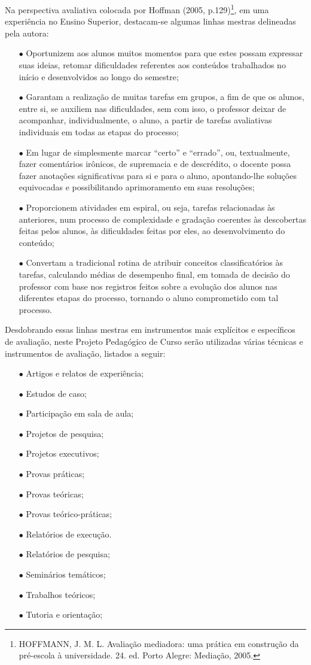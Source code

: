 Na perspectiva avaliativa colocada por Hoffman (2005, p.129)\footnote[5]{HOFFMANN, J. M. L. Avaliação mediadora: uma prática em construção da pré-escola à universidade. 24. ed. Porto Alegre: Mediação, 2005.}, em uma experiência no Ensino Superior, destacam-se algumas linhas mestras delineadas pela autora:
\begin{enumerate}
\item[$\bullet$]Oportunizem aos alunos muitos momentos para que estes possam expressar suas ideias, retomar dificuldades referentes aos conteúdos trabalhados no início e desenvolvidos ao longo do semestre;
\item[$\bullet$]Garantam a realização de muitas tarefas em grupos, a fim de que os alunos, entre si, se auxiliem nas dificuldades, sem com isso, o professor deixar de acompanhar, individualmente, o aluno, a partir de tarefas avaliativas individuais em todas as etapas do processo;
\item[$\bullet$]Em lugar de simplesmente marcar “certo” e “errado”, ou, textualmente, fazer comentários irônicos, de supremacia e de descrédito, o docente possa fazer anotações significativas para si e para o aluno, apontando-lhe soluções equivocadas e possibilitando aprimoramento em suas resoluções;
\item[$\bullet$]Proporcionem atividades em espiral, ou seja, tarefas relacionadas às anteriores, num processo de complexidade e gradação coerentes às descobertas feitas pelos alunos, às dificuldades feitas por eles, ao desenvolvimento do conteúdo;
\item[$\bullet$]Convertam a tradicional rotina de atribuir conceitos classificatórios às tarefas, calculando médias de desempenho final, em tomada de decisão do professor com base nos registros feitos sobre a evolução dos alunos nas diferentes etapas do processo, tornando o aluno comprometido com tal processo.
\end{enumerate}
Desdobrando essas linhas mestras em instrumentos mais explícitos e específicos de avaliação, neste Projeto Pedagógico de Curso serão utilizadas várias técnicas e instrumentos de avaliação, listados a seguir:
\begin{enumerate}
\item[$\bullet$] Artigos e relatos de experiência;
\item[$\bullet$] Estudos de caso;
\item[$\bullet$] Participação em sala de aula;
\item[$\bullet$] Projetos de pesquisa;
\item[$\bullet$] Projetos executivos;
\item[$\bullet$] Provas práticas;
\item[$\bullet$] Provas teóricas;
\item[$\bullet$] Provas teórico-práticas;
\item[$\bullet$] Relatórios de execução.
\item[$\bullet$] Relatórios de pesquisa;
\item[$\bullet$] Seminários temáticos;
\item[$\bullet$] Trabalhos teóricos;
\item[$\bullet$] Tutoria e orientação;
\end{enumerate}

